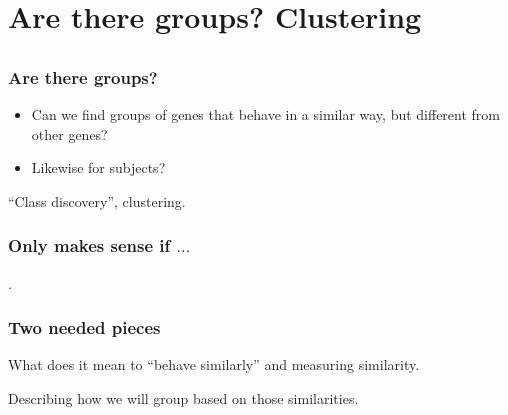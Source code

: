 \section[Clustering]{Are there groups? Clustering}
\subsection{}




\begin{frame}
\frametitle{Are there groups?}
\begin{itemize}
\item Can we find groups of genes that behave in a similar way, but
  different from other genes?
\item Likewise for subjects?
\end{itemize}

``Class discovery'', clustering.


\end{frame}


\begin{frame}
\frametitle{Only makes sense if $\ldots$}
.

\end{frame}




\begin{frame}
\frametitle{Two needed pieces}

What does it mean to ``behave similarly'' and measuring similarity.
\vspace*{20pt}

Describing how we will group based on those similarities.

\end{frame}




